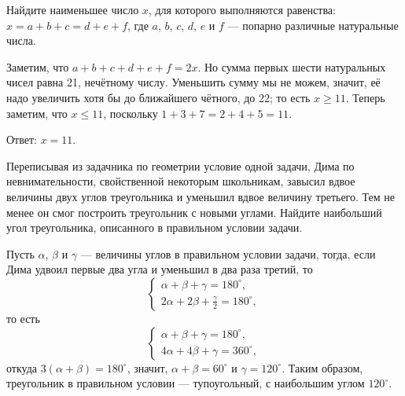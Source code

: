
\begin{itemize}
\itC Найдите наименьшее число $x$, для которого выполняются равенства:
$x = a+b+c = d+e+f$, где $a$, $b$, $c$, $d$, $e$ и $f$ --- попарно различные натуральные числа.

\itr Заметим, что $a+b+c+d+e+f=2x$. Но сумма первых шести натуральных чисел равна 21, нечётному числу.
Уменьшить сумму мы не можем, значит, её надо увеличить хотя бы до ближайшего чётного, до 22;
то есть $x \ge 11$. Теперь заметим, что $x \le 11$, поскольку
$1 + 3 +7 = 2 + 4 + 5 = 11$.

Ответ: $x=11$.
\end{itemize}

\begin{itemize}
\itB Переписывая из задачника по геометрии условие одной задачи, Дима по невнимательности, 
свойственной некоторым школьникам, завысил вдвое величины двух углов треугольника и уменьшил 
вдвое величину третьего. Тем не менее он смог построить треугольник с новыми углами. Найдите 
наибольший угол треугольника, описанного в правильном условии задачи.

\itr
 Пусть $\alpha$, $\beta$ и $\gamma$ --- величины углов в правильном условии задачи, тогда, если 
Дима удвоил первые два угла и уменьшил в два раза третий, то
$$
\begin{cases}
\alpha+\beta+\gamma=180^{\circ},\\
2\alpha+2\beta+\frac{\gamma}{2}=180^{\circ},
\end{cases}
$$
то есть
$$
\begin{cases}
\alpha+\beta+\gamma=180^{\circ},\\
4\alpha+4\beta+\gamma=360^{\circ},
\end{cases}
$$
откуда $3(\alpha+\beta)=180^{\circ}$, значит, $\alpha+\beta=60^\circ$ и $\gamma=120^{\circ}$.
Таким образом, треугольник в правильном условии — тупоугольный, с наибольшим углом 
$120^{\circ}$.

\end{itemize}
